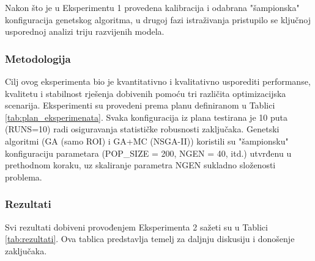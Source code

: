 Nakon što je u Eksperimentu 1 provedena kalibracija i odabrana "šampionska" konfiguracija genetskog algoritma, u drugoj fazi istraživanja pristupilo se ključnoj usporednoj analizi triju razvijenih modela.

\subsubsection{Metodologija}
Cilj ovog eksperimenta bio je kvantitativno i kvalitativno usporediti performanse, kvalitetu i stabilnost rješenja dobivenih pomoću tri različita optimizacijska scenarija. Eksperimenti su provedeni prema planu definiranom u Tablici \ref{tab:plan_eksperimenata}. Svaka konfiguracija iz plana testirana je 10 puta (RUNS=10) radi osiguravanja statističke robusnosti zaključaka. Genetski algoritmi (GA (samo ROI) i GA+MC (NSGA-II)) koristili su "šampionsku" konfiguraciju parametara (POP\_SIZE = 200, NGEN = 40, itd.) utvrđenu u prethodnom koraku, uz skaliranje parametra NGEN sukladno složenosti problema.

\begin{table}[h!]
    \centering
    \caption{Plan naprednih eksperimenata}
    \label{tab:plan_eksperimenata}
\end{table}

\subsubsection{Rezultati}
Svi rezultati dobiveni provođenjem Eksperimenta 2 sažeti su u Tablici \ref{tab:rezultati}. Ova tablica predstavlja temelj za daljnju diskusiju i donošenje zaključaka.

